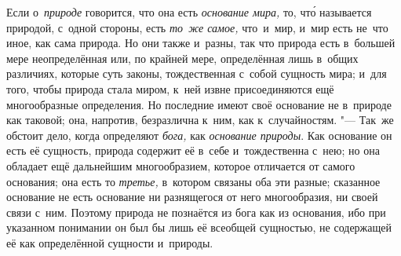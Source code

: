 Если о~{\em природе} говорится, что она есть {\em основание мира,} то, чт\'{о}
называется природой, с~одной стороны, есть {\em то~же самое,} что~и~мир, и~мир
есть не~что иное, как сама природа. Но они также и~разны, так что природа есть
в~большей мере неопределённая или, по крайней мере, определённая лишь в~общих
различиях, которые суть законы, тождественная с~собой сущность мира; и~для
того, чтобы природа стала миром, к~ней извне присоединяются ещё многообразные
определения. Но последние имеют своё основание не в~природе как таковой; она,
напротив, безразлична к~ним, как к~случайностям. "--- Так~же обстоит дело,
когда определяют {\em бога,} как {\em основание природы}. Как основание он есть
её сущность, природа содержит её в~себе и~тождественна с~нею; но она обладает
ещё дальнейшим многообразием, которое отличается от самого основания; она есть
то {\em третье,} в~котором связаны оба эти разные; сказанное основание не есть
основание ни разнящегося от него многообразия, ни своей связи с~ним. Поэтому
природа не познаётся из бога как из основания, ибо при указанном понимании он
был бы лишь её всеобщей сущностью, не содержащей её как определённой
сущности и~природы.

